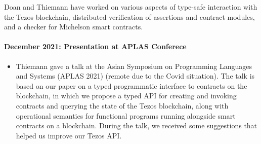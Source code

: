\documentclass[a4paper,11pt]{article}
\begin{document}
Doan and Thiemann have worked on various aspects of type-safe interaction with the Tezos blockchain, distributed verification of assertions and contract modules, and a checker for Michelson smart contracts.

\paragraph{December 2021: Presentation at APLAS Conferece} 

\begin{itemize}
\item Thiemann gave a talk at the Asian Symposium on Programming Languages and Systems (APLAS 2021) (remote due to the Covid situation). The talk is based on our paper on a typed programmatic interface to contracts on the blockchain, in which we propose a typed API for creating and invoking contracts and querying the state of the Tezos blockchain, along with operational semantics for functional programs running alongside smart contracts on a blockchain. During the talk, we received some suggestions that helped us improve our Tezos API.
\end{itemize}

 
\end{document}
